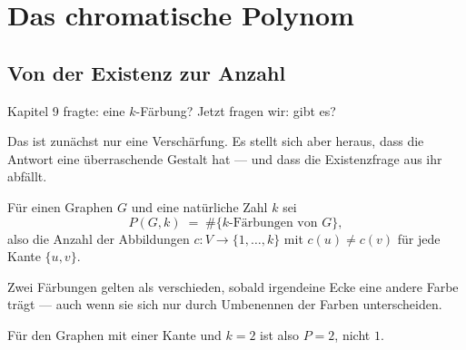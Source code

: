 \chapter{Das chromatische Polynom}

\section{Von der Existenz zur Anzahl}

Kapitel 9 fragte:  eine $k$-Färbung? Jetzt fragen wir:  gibt es?

Das ist zunächst nur eine Verschärfung. Es stellt sich aber heraus, dass die Antwort eine überraschende Gestalt hat --- und dass die Existenzfrage aus ihr abfällt.

\begin{definition}
Für einen Graphen $G$ und eine natürliche Zahl $k$ sei
\[ P(G, k) \;=\; \#\{\text{$k$-Färbungen von } G\} , \]
also die Anzahl der Abbildungen $c : V \to \{1,\ldots,k\}$ mit $c(u) \neq c(v)$ für jede Kante $\{u,v\}$.
\end{definition}

\begin{warnung}
Zwei Färbungen gelten als verschieden, sobald irgendeine Ecke eine andere Farbe trägt --- auch wenn sie sich nur durch Umbenennen der Farben unterscheiden.

\begin{center}
\end{center}

Für den Graphen mit einer Kante und $k = 2$ ist also $P = 2$, nicht $1$.

\begin{center}
\begin{minipage}{0.88\textwidth}
\end{minipage}
\end{center}
\end{warnung}


